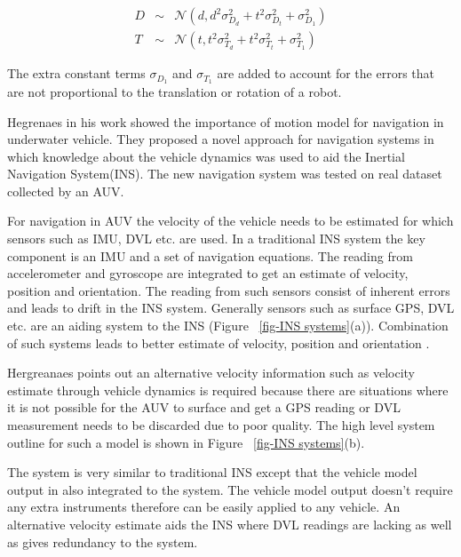 \documentclass[12pt]{dalcsthesis}
\begin{document}
\begin{equation}
\label{eq-:noise_model_yapp}
\begin{aligned}
D &\sim& \mathcal{{N}}(d,d^2\sigma_{D_{d}}^2+t^2\sigma_{D_{t}}^2+\sigma_{D_{1}}^2) \\
T &\sim& \mathcal{{N}}(t,t^2\sigma_{T_{d}}^2+t^2\sigma_{T_{t}}^2+\sigma_{T_{1}}^2)
\end{aligned}
\end{equation}

The extra constant terms $\sigma_{D_{1}}$ and $\sigma_{T_{1}}$ are added to account for the errors that are not proportional to the translation or rotation of a robot. 

Hegrenaes \cite{Hegrenæs2008} in his work showed the importance of motion model for navigation in underwater vehicle. They proposed a novel approach for navigation systems in which knowledge about the vehicle dynamics was used to aid the Inertial Navigation System(INS). The new navigation system was tested on real dataset collected by an AUV.

For navigation in AUV the velocity of the vehicle needs to be estimated for which sensors such as IMU, DVL etc. are used. In a traditional INS system the key component is an IMU and a set of navigation equations. The reading from accelerometer and gyroscope are integrated to get an estimate of velocity, position and orientation. The reading from such sensors consist of inherent errors and leads to drift in the INS system. Generally sensors such as surface GPS, DVL etc. are an aiding system to the INS (Figure ~\ref{fig-INS systems}(a)). Combination of such systems leads to better estimate of velocity, position and orientation \cite{leonard1998autonomous}. 

Hergreanaes \cite{Hegrenæs2008} points out an alternative velocity information such as velocity estimate through vehicle dynamics is required because there are situations where it is not possible for the AUV to surface and get a GPS reading or DVL measurement needs to be discarded due to poor quality. The high level system outline for such a model is shown in Figure ~\ref{fig-INS systems}(b).

The system is very similar to traditional INS except that the vehicle model output in also integrated to the system. The vehicle model output doesn't require any extra instruments therefore can be easily applied to any vehicle. An alternative velocity estimate aids the INS where DVL readings are lacking as well as gives redundancy to the system. 
\end{document}
